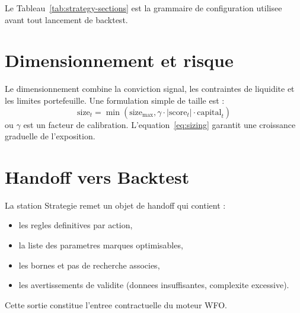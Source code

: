 Le Tableau~\ref{tab:strategy-sections} est la grammaire de configuration
utilisee avant tout lancement de backtest.

\section{Dimensionnement et risque}
Le dimensionnement combine la conviction signal, les contraintes de liquidite et
les limites portefeuille. Une formulation simple de taille est :
\begin{equation}
\text{size}_t = \min\left(\text{size}_{\max},
\gamma\cdot |\text{score}_t| \cdot \text{capital}_t\right)
\label{eq:sizing}
\end{equation}
ou $\gamma$ est un facteur de calibration. L'equation~\ref{eq:sizing}
garantit une croissance graduelle de l'exposition.

\section{Handoff vers Backtest}
La station Strategie remet un objet de handoff qui contient :
\begin{itemize}
\item les regles definitives par action,
\item la liste des parametres marques optimisables,
\item les bornes et pas de recherche associes,
\item les avertissements de validite (donnees insuffisantes, complexite excessive).
\end{itemize}
Cette sortie constitue l'entree contractuelle du moteur WFO.

